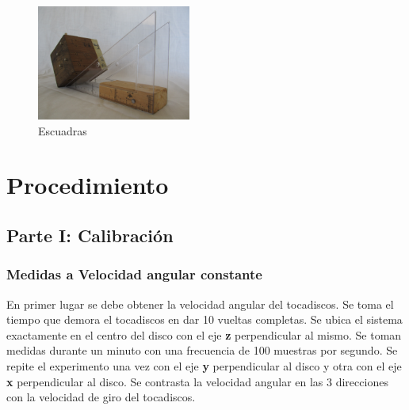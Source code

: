 \documentclass[spanish,12pt,a4paper,titlepage]{report}
\begin{document}
\begin{figure}
  \vspace{-20pt}
  \begin{center}
    \includegraphics[width=0.45\textwidth]
    	{./pics/escuadra.jpg}
  \end{center}
  \vspace{-20pt}
  \caption{Escuadras}
  \label{fig:escuadras}
  \vspace{-10pt}
\end{figure}




















\section{Procedimiento}

\subsection{Parte I: Calibración}

\subsubsection*{Medidas a Velocidad angular constante}
En primer lugar se debe obtener la velocidad angular del tocadiscos. Se toma el tiempo que demora el tocadiscos en dar 10 vueltas completas. Se ubica el sistema exactamente en el centro del disco con el eje \textbf{z} perpendicular al mismo. Se toman medidas durante un minuto con una frecuencia de 100 muestras por segundo. Se repite el experimento una vez con el eje \textbf{y} perpendicular al disco y otra con el eje \textbf{x} perpendicular al disco. Se contrasta la velocidad angular en las 3 direcciones con la velocidad de giro del tocadiscos.
\end{document}
